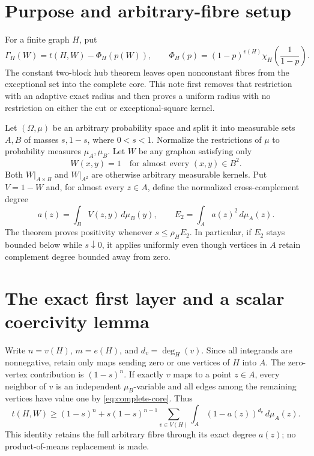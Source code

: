 \documentclass[11pt]{article}
\newcommand{\dd}{\,d}
\begin{document}
\section{Purpose and arbitrary-fibre setup}

For a finite graph $H$, put
\[
 \Gamma_H(W)=t(H,W)-\Phi_H(p(W)),
 \qquad
 \Phi_H(p)=(1-p)^{v(H)}
 \chi_H\!\left(\frac1{1-p}\right).
\]
The constant two-block hub theorem leaves open nonconstant fibres from the
exceptional set into the complete core.  This note first removes that
restriction with an adaptive exact radius and then proves a uniform radius
with no restriction on either the cut or exceptional-square kernel.

Let $(\Omega,\mu)$ be an arbitrary probability space and split it into
measurable sets $A,B$ of masses $s,1-s$, where $0<s<1$.  Normalize the
restrictions of $\mu$ to probability measures $\mu_A,\mu_B$.  Let $W$ be any
graphon satisfying only
\begin{equation}
 W(x,y)=1\quad\text{for almost every }(x,y)\in B^2.
 \label{eq:complete-core}
\end{equation}
Both $W|_{A\times B}$ and $W|_{A^2}$ are otherwise arbitrary measurable
kernels.  Put $V=1-W$ and, for almost every $z\in A$, define the normalized
cross-complement degree
\begin{equation}
 a(z)=\int_B V(z,y)\dd\mu_B(y),
 \qquad
 E_2=\int_Aa(z)^2\dd\mu_A(z).
 \label{eq:cross-energy}
\end{equation}
The theorem proves positivity whenever $s\leq\rho_HE_2$.  In particular, if
$E_2$ stays bounded below while $s\downarrow0$, it applies uniformly even
though vertices in $A$ retain complement degree bounded away from zero.


\section{The exact first layer and a scalar coercivity lemma}

Write $n=v(H)$, $m=e(H)$, and $d_v=\deg_H(v)$.  Since all integrands are
nonnegative, retain only maps sending zero or one vertices of $H$ into $A$.
The zero-vertex contribution is $(1-s)^n$.  If exactly $v$ maps to a point
$z\in A$, every neighbor of $v$ is an independent $\mu_B$-variable and all
edges among the remaining vertices have value one by
\eqref{eq:complete-core}.  Thus
\begin{equation}
 t(H,W)\geq(1-s)^n+s(1-s)^{n-1}
 \sum_{v\in V(H)}\int_A(1-a(z))^{d_v}\dd\mu_A(z).
 \label{eq:first-layer}
\end{equation}
This identity retains the full arbitrary fibre through its exact degree
$a(z)$; no product-of-means replacement is made.
\end{document}
